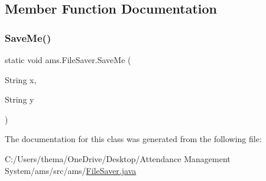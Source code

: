 \subsection{Member Function Documentation}
\mbox{\label{classams_1_1_file_saver_a925b8d63d7240a7e925f26d8cd0f0988}} 
\subsubsection{\texorpdfstring{SaveMe()}{SaveMe()}}
{\footnotesize\ttfamily static void ams.\+File\+Saver.\+Save\+Me (\begin{DoxyParamCaption}\item[{String}]{x,  }\item[{String}]{y }\end{DoxyParamCaption})\hspace{0.3cm}{\ttfamily [static]}}



The documentation for this class was generated from the following file\+:\begin{DoxyCompactItemize}
\item 
C\+:/\+Users/thema/\+One\+Drive/\+Desktop/\+Attendance Management System/ams/src/ams/\mbox{\hyperlink{_file_saver_8java}{File\+Saver.\+java}}\end{DoxyCompactItemize}
